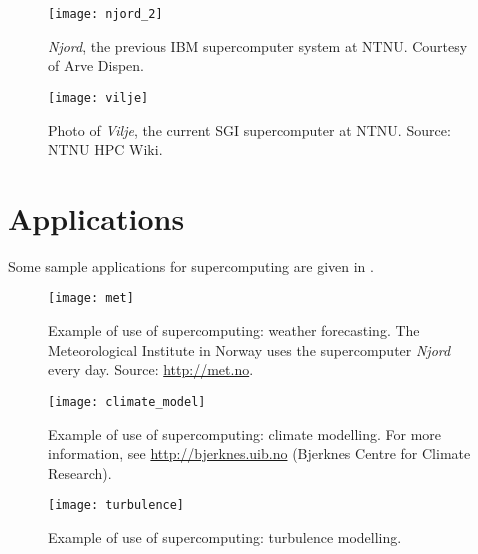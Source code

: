 \begin{figure}
  \centering
  \texttt{[image: njord\_2]}
  \caption{
    \emph{Njord}, the previous IBM supercomputer system at NTNU. Courtesy of
    Arve Dispen.
  }
  \label{fig:njord}
\end{figure}

\begin{figure}
  \centering
  \texttt{[image: vilje]}
  \caption{
    Photo of \emph{Vilje}, the current SGI supercomputer at NTNU.
    Source: NTNU HPC Wiki.
  }
  \label{fig:vilje}
\end{figure}

\section{Applications}

Some sample applications for supercomputing are given in .

\vspace{2cm}
\begin{figure}[!ht]
  \centering
  \texttt{[image: met]}
  \caption{
    Example of use of supercomputing: weather forecasting. The Meteorological
    Institute in Norway uses the supercomputer \emph{Njord} every day. Source:
    \protect\url{http://met.no}.
  }
  \label{fig:met}
\end{figure}

\begin{figure}[!ht]
  \centering
  \texttt{[image: climate\_model]}
  \caption{
    Example of use of supercomputing: climate modelling. For more information,
    see \protect\url{http://bjerknes.uib.no} (Bjerknes Centre for Climate Research).
  }
  \label{fig:climate}
\end{figure}

\begin{figure}[!ht]
  \centering
  \texttt{[image: turbulence]}
  \caption{
    Example of use of supercomputing: turbulence modelling.
  }
  \label{fig:turbulence}
\end{figure}
